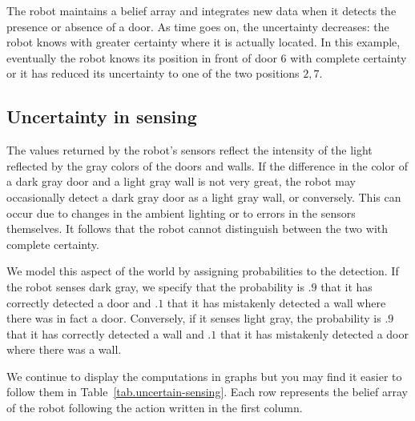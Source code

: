 \begin{center}
\end{center}
\vspace{-1ex}
The robot maintains a belief array and integrates new data when it detects the presence or absence of a door. As time goes on, the uncertainty decreases: the robot  knows with greater certainty where it is actually located. In this example, eventually the robot knows its position in front of door $6$ with complete certainty or it has reduced its uncertainty to one of the two positions $2,7$.

\subsection{Uncertainty in sensing}

The values returned by the robot's sensors reflect the intensity of the light reflected by the gray colors of the doors and walls. If the difference in the color of a dark gray door and a light gray wall is not very great, the robot may occasionally detect a dark gray door as a light gray wall, or conversely. This can occur due to changes in the ambient lighting or to errors in the sensors themselves. It follows that the robot cannot distinguish between the two with complete certainty.

We model this aspect of the world by assigning probabilities to the detection. If the robot senses dark gray, we specify that the probability is $.9$ that it has correctly detected a door and $.1$ that it has mistakenly detected a wall where there was in fact a door. Conversely, if it senses light gray, the probability is $.9$ that it has correctly detected a wall and $.1$ that it has mistakenly detected a door where there was a wall.

We continue to display the computations in graphs but you may find it easier to follow them in Table~\ref{tab.uncertain-sensing}. Each row represents the belief array of the robot following the action written in the first column.

